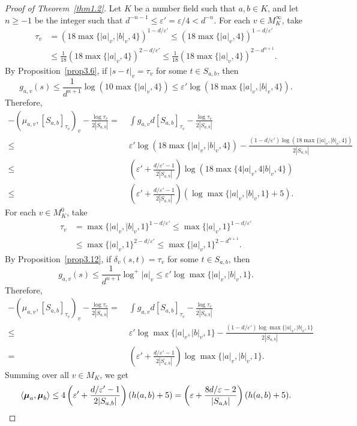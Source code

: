 \documentclass[11pt]{amsart}
\numberwithin{equation}{section}
\theoremstyle{plain}
\theoremstyle{definition}
\theoremstyle{remark}
\begin{document}
\begin{proof}[Proof of Theorem~\ref{thm1.2}]
Let $K$ be a number field such
that $a,b\in K$, and let $n\geq-1$ be the integer such that $d^{-n-1}\leq\varepsilon'=\varepsilon/4<d^{-n}$.
For each $v\in M_{K}^{\infty}$, take
\begin{align*}
\tau_{v} & =(18\max\{|a|_{v},|b|_{v},4\})^{1-d/\varepsilon'}\leq(18\max\{|a|_{v},4\})^{1-d/\varepsilon'}\\
 & \leq\frac{1}{18}(18\max\{|a|_{v},4\})^{2-d/\varepsilon'}\leq\frac{1}{18}(18\max\{|a|_{v},4\})^{2-d^{n+1}}.
\end{align*}
By Proposition~\ref{prop3.6}, if $|s-t|_{v}=\tau_{v}$ for some $t\in S_{a,b}$,
then
\[
g_{a,v}(s)\leq\frac{1}{d^{n+1}}\log(10\max\{|a|_{v},4\})\leq\varepsilon'\log(18\max\{|a|_{v},|b|_{v},4\}).
\]
Therefore,
\begin{align*}
 -\left(\mu_{a,v},[S_{a,b}]_{\tau_{v}}\right)_{v}-\frac{\log\tau_{v}}{2|S_{a,b}|}=\;&\int g_{a,v}d[S_{a,b}]_{\tau_{v}}-\frac{\log\tau_{v}}{2|S_{a,b}|}\\
\leq\; & \varepsilon'\log(18\max\{|a|_{v},|b|_{v},4\})-\frac{(1-d/\varepsilon')\log(18\max\{|a|_{v},|b|_{v},4\})}{2|S_{a,b}|}\\
\leq\; & \left(\varepsilon'+\frac{d/\varepsilon'-1}{2|S_{a,b}|}\right)\log(18\max\{4|a|_{v},4|b|_{v},4\})\\
\leq\; & \left(\varepsilon'+\frac{d/\varepsilon'-1}{2|S_{a,b}|}\right)(\log\max\{|a|_{v},|b|_{v},1\}+5).
\end{align*}
For each $v\in M_{K}^{0}$, take
\begin{align*}
\tau_{v} & =\max\{|a|_{v},|b|_{v},1\}^{1-d/\varepsilon'}\leq\max\{|a|_{v},1\}^{1-d/\varepsilon'}\\
 & \leq\max\{|a|_{v},1\}^{2-d/\varepsilon'}\leq\max\{|a|_{v},1\}^{2-d^{n+1}}.
\end{align*}
By Proposition~\ref{prop3.12}, if $\delta_{v}(s,t)=\tau_{v}$ for
some $t\in S_{a,b}$, then
\[
g_{a,v}(s)\leq\frac{1}{d^{n+1}}\log^{+}|a|_{v}\leq\varepsilon'\log\max\{|a|_{v},|b|_{v},1\}.
\]
Therefore,
\begin{align*}
  -\left(\mu_{a,v},[S_{a,b}]_{\tau_{v}}\right)_{v}-\frac{\log\tau_{v}}{2|S_{a,b}|}=\;&\int g_{a,v}d[S_{a,b}]_{\tau_{v}}-\frac{\log\tau_{v}}{2|S_{a,b}|}\\
\leq\; & \varepsilon'\log\max\{|a|_{v},|b|_{v},1\}-\frac{(1-d/\varepsilon')\log\max\{|a|_{v},|b|_{v},1\}}{2|S_{a,b}|}\\
=\; & \left(\varepsilon'+\frac{d/\varepsilon'-1}{2|S_{a,b}|}\right)\log\max\{|a|_{v},|b|_{v},1\}.
\end{align*}
Summing over all $v\in M_{K}$, we get
\[
\left\langle \boldsymbol{\mu}_{a},\boldsymbol{\mu}_{b}\right\rangle \leq4\left(\varepsilon'+\frac{d/\varepsilon'-1}{2|S_{a,b}|}\right)(h(a,b)+5)=\left(\varepsilon+\frac{8d/\varepsilon-2}{|S_{a,b}|}\right)(h(a,b)+5).\qedhere
\]
\end{proof}
\end{document}
